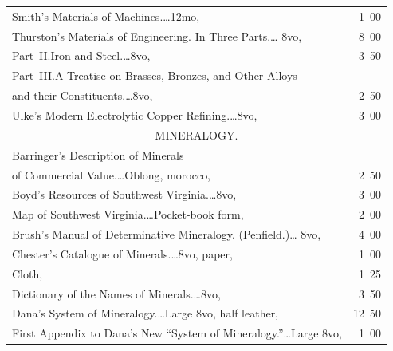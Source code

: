 \documentclass[a4paper,12pt]{book}[2004/02/16]
\providecommand{\colorbox}[2]{#2}
\newcommand{\correction}[2]{\colorbox{corr}{#1}}
\theoremstyle{ilemma}
\theoremstyle{itheorem}
\theoremstyle{iother}
\theoremstyle{icorollary}
\theoremstyle{numcorollary}
\theoremstyle{idefinition}
\begin{document}
\begin{longtable}{@{}l@{ }r@{}}
Smith's Materials of Machines.\dotfill\ldots 12mo, & 1\ 00\\

Thurston's Materials of Engineering. In Three Parts.\dotfill\ldots
8vo, & 8\ 00\\

\indent Part~II.\quad Iron and Steel.\dotfill\ldots 8vo, & 3\ 50\\

\indent Part~III.\quad A Treatise on Brasses, Bronzes, and Other Alloys\\

\indent\indent and their Constituents.\dotfill\ldots 8vo, & 2\ 50\\

Ulke's Modern Electrolytic Copper Refining.\dotfill\ldots 8vo, & 3\
00\\[3em]



\multicolumn{2}{c}{\large MINERALOGY.}\\[1em]

\nopagebreak

Barringer's Description of Minerals\\

\nopagebreak

\indent\indent of Commercial Value.\dotfill\ldots Oblong, morocco, & 2\ 50\\

Boyd's Resources of Southwest Virginia.\dotfill\ldots 8vo, & 3\ 00\\

\indent Map of Southwest \correction{Virginia}{Virignia}.\dotfill\ldots Pocket-book form, &
2\ 00\\

Brush's Manual of Determinative Mineralogy. (Penfield.)\dotfill\ldots
8vo, & 4\ 00\\

Chester's Catalogue of Minerals.\dotfill\ldots 8vo, paper, & 1\ 00\\

\hfill Cloth, & 1\ 25\\

\indent Dictionary of the Names of Minerals.\dotfill\ldots 8vo, & 3\ 50\\

Dana's System of Mineralogy.\dotfill\ldots Large 8vo, half leather, &
12\ 50\\

\indent First Appendix to Dana's New ``System of
Mineralogy.''\dotfill\ldots Large 8vo, & 1\ 00\\


\end{longtable}
\end{document}
